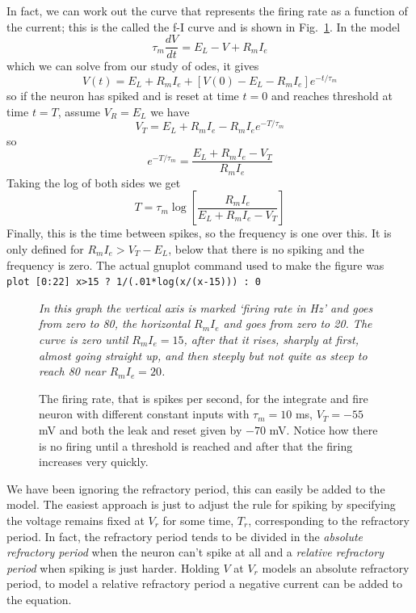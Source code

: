 \documentclass[12pt]{article}
\begin{document}
In fact, we can work out the curve that represents the firing rate as
a function of the current; this is the called the f-I curve and is shown in Fig.~\ref{f_i_curve}. In the model
\begin{equation}
\tau_m\frac{dV}{dt}=E_L-V+R_mI_e
\end{equation}
which we can solve from our study of odes, it gives
\begin{equation}
V(t)=E_L+R_mI_e+[V(0)-E_L-R_mI_e]e^{-t/\tau_m}
\end{equation}
so if the neuron has spiked and is reset at time $t=0$ and reaches
threshold at time $t=T$, assume $V_R=E_L$ we have
\begin{equation}
V_T=E_L+R_mI_e-R_mI_ee^{-T/\tau_m}
\end{equation}
so 
\begin{equation}
e^{-T/\tau_m}=\frac{E_L+R_mI_e-V_T}{R_mI_e}
\end{equation}
Taking the log of both sides we get
\begin{equation}
T=\tau_m\log\left[\frac{R_mI_e}{E_L+R_mI_e-V_T}\right]
\end{equation}
Finally, this is the time between spikes, so the frequency is one over this. It is only defined for $R_mI_e>V_T-E_L$, below that there is no spiking and the frequency is zero. The actual gnuplot command used to make the figure was\\
\texttt{plot [0:22] x>15 ? 1/(.01*log(x/(x-15))) : 0}


\begin{figure}
  \begin{center}
    {\textsl{In this graph the vertical axis is marked `firing rate in Hz' and goes from zero to 80, the horizontal $R_mI_e$ and goes from zero to 20. The curve is zero until $R_mI_e=15$, after that it rises, sharply at first, almost going straight up, and then steeply but not quite as steep to reach 80 near $R_mI_e=20$.} }
{
}
  \end{center}
\caption{The firing rate, that is spikes per second, for the integrate
  and fire neuron with different constant inputs with $\tau_m=10$ ms,
  $V_T=-55$ mV and both the leak and reset given by $-70$ mV. Notice
  how there is no firing until a threshold is reached and after that
  the firing increases very quickly. \label{f_i_curve}}
\end{figure}


We have been ignoring the refractory period, this can easily be added
to the model. The easiest approach is just to adjust the rule for
spiking by specifying the voltage remains fixed at $V_r$ for some
time, $T_r$, corresponding to the refractory period. In fact, the
refractory period tends to be divided in the \textsl{absolute
  refractory period} when the neuron can't spike at all and a
\textsl{relative refractory period} when spiking is just
harder. Holding $V$ at $V_r$ models an absolute refractory period, to
model a relative refractory period a negative current can be added to
the equation.
\end{document}
